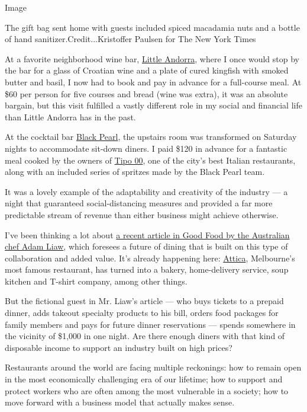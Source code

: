 Image

The gift bag sent home with guests included spiced macadamia nuts and a
bottle of hand sanitizer.Credit...Kristoffer Paulsen for The New York
Times

At a favorite neighborhood wine bar,
\href{https://littleandorra.com.au/}{Little Andorra}, where I once would
stop by the bar for a glass of Croatian wine and a plate of cured
kingfish with smoked butter and basil, I now had to book and pay in
advance for a full-course meal. At \$60 per person for five courses and
bread (wine was extra), it was an absolute bargain, but this visit
fulfilled a vastly different role in my social and financial life than
Little Andorra has in the past.

At the cocktail bar \href{https://www.blackpearlbar.com.au/}{Black
Pearl}, the upstairs room was transformed on Saturday nights to
accommodate sit-down diners. I paid \$120 in advance for a fantastic
meal cooked by the owners of \href{https://www.tipo00.com.au/}{Tipo 00},
one of the city's best Italian restaurants, along with an included
series of spritzes made by the Black Pearl team.

It was a lovely example of the adaptability and creativity of the
industry --- a night that guaranteed social-distancing measures and
provided a far more predictable stream of revenue than either business
might achieve otherwise.

I've been thinking a lot about
\href{https://www.goodfood.com.au/eat-out/news/adam-liaws-forecast-for-fine-dining-in-the-future-20200603-h1oibb}{a
recent article in Good Food by the Australian chef Adam Liaw}, which
foresees a future of dining that is built on this type of collaboration
and added value. It's already happening here:
\href{https://www.attica.com.au/}{Attica}, Melbourne's most famous
restaurant, has turned into a bakery, home-delivery service, soup
kitchen and T-shirt company, among other things.

But the fictional guest in Mr. Liaw's article --- who buys tickets to a
prepaid dinner, adds takeout specialty products to his bill, orders food
packages for family members and pays for future dinner reservations ---
spends somewhere in the vicinity of \$1,000 in one night. Are there
enough diners with that kind of disposable income to support an industry
built on high prices?

Restaurants around the world are facing multiple reckonings: how to
remain open in the most economically challenging era of our lifetime;
how to support and protect workers who are often among the most
vulnerable in a society; how to move forward with a business model that
actually makes sense.

